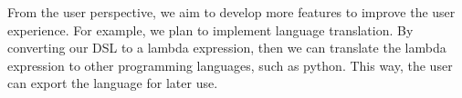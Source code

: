 From the user perspective, we aim to develop more features to improve the user experience. For example, we plan to implement language translation. By converting our DSL to a lambda expression, then we can translate the lambda expression to other programming languages, such as python. This way, the user can export the language for later use.